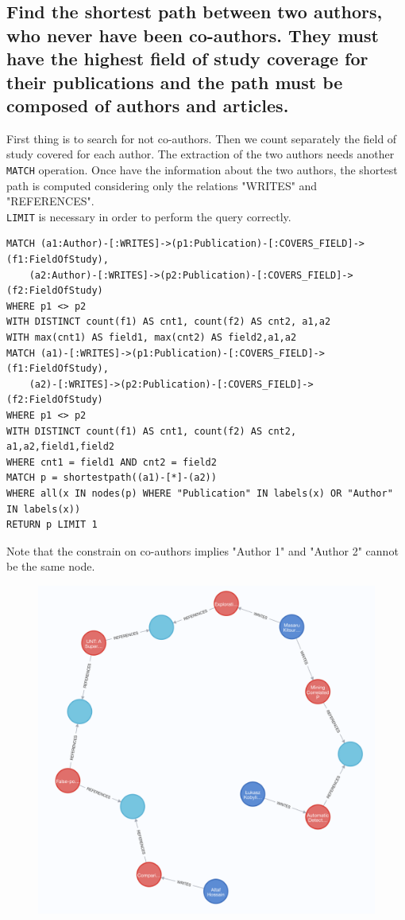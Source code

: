\documentclass{Configuration_Files/PoliMi3i_thesis}
\begin{document}
\subsection{Find the shortest path between two authors, who never have been co-authors. They must have the highest field of study coverage for their publications and the path must be composed of authors and articles.}
First thing is to search for not co-authors.
Then we count separately the field of study covered for each author.
The extraction of the two authors needs another \texttt{MATCH} operation.
Once have the information about the two authors, the shortest path is computed considering only the relations "WRITES" and "REFERENCES". \\
\texttt{LIMIT} is necessary in order to perform the query correctly.\\
\begin{lstlisting}[language=cypher, label=lst:cypher-example]
MATCH (a1:Author)-[:WRITES]->(p1:Publication)-[:COVERS_FIELD]->(f1:FieldOfStudy),
    (a2:Author)-[:WRITES]->(p2:Publication)-[:COVERS_FIELD]->(f2:FieldOfStudy)
WHERE p1 <> p2
WITH DISTINCT count(f1) AS cnt1, count(f2) AS cnt2, a1,a2
WITH max(cnt1) AS field1, max(cnt2) AS field2,a1,a2
MATCH (a1)-[:WRITES]->(p1:Publication)-[:COVERS_FIELD]->(f1:FieldOfStudy),
    (a2)-[:WRITES]->(p2:Publication)-[:COVERS_FIELD]->(f2:FieldOfStudy)
WHERE p1 <> p2
WITH DISTINCT count(f1) AS cnt1, count(f2) AS cnt2, a1,a2,field1,field2
WHERE cnt1 = field1 AND cnt2 = field2
MATCH p = shortestpath((a1)-[*]-(a2))
WHERE all(x IN nodes(p) WHERE "Publication" IN labels(x) OR "Author" IN labels(x))
RETURN p LIMIT 1
\end{lstlisting}
Note that the constrain on co-authors implies "Author 1" and "Author 2" cannot be the same node. \\
\begin{figure}[H]
    \centering
    \includegraphics[height=0.44\textwidth]{Images/query_13.png}
        \caption{}
    \label{fig:13}
\end{figure}
\end{document}
